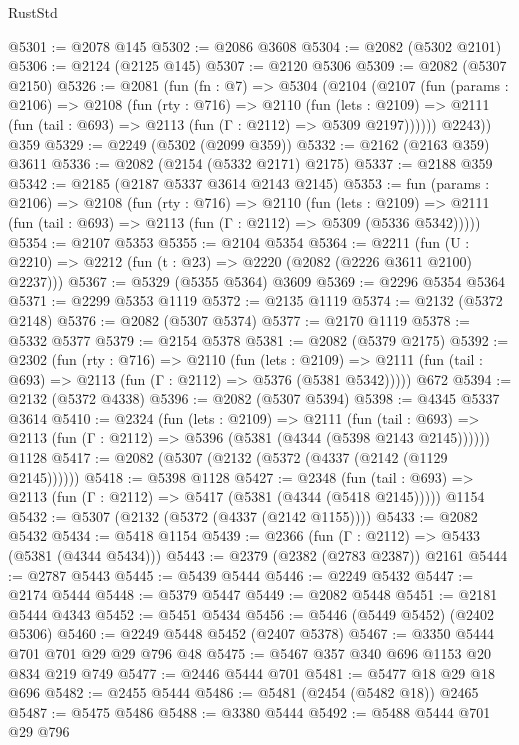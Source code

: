 \begin{lexlean}{RustStd}
\begin{coremodule}
@5301 := @2078 @145
@5302 := @2086 @3608
@5304 := @2082 (@5302 @2101)
@5306 := @2124 (@2125 @145)
@5307 := @2120 @5306
@5309 := @2082 (@5307 @2150)
@5326 := @2081
    (fun (fn : @7) =>
    @5304
      (@2104
        (@2107
          (fun (params : @2106) =>
          @2108
            (fun (rty : @716) =>
            @2110
              (fun (lets : @2109) =>
              @2111 (fun (tail : @693) => @2113 (fun (Γ : @2112) => @5309 @2197))))))
        @2243))
    @359
@5329 := @2249 (@5302 (@2099 @359))
@5332 := @2162 (@2163 @359) @3611
@5336 := @2082 (@2154 (@5332 @2171) @2175)
@5337 := @2188 @359
@5342 := @2185 (@2187 @5337 @3614 @2143 @2145)
@5353 := fun (params : @2106) =>
  @2108
    (fun (rty : @716) =>
    @2110
      (fun (lets : @2109) =>
      @2111 (fun (tail : @693) => @2113 (fun (Γ : @2112) => @5309 (@5336 @5342)))))
@5354 := @2107 @5353
@5355 := @2104 @5354
@5364 := @2211 (fun (U : @2210) => @2212 (fun (t : @23) => @2220 (@2082 (@2226 @3611 @2100) @2237)))
@5367 := @5329 (@5355 @5364) @3609
@5369 := @2296 @5354 @5364
@5371 := @2299 @5353 @1119
@5372 := @2135 @1119
@5374 := @2132 (@5372 @2148)
@5376 := @2082 (@5307 @5374)
@5377 := @2170 @1119
@5378 := @5332 @5377
@5379 := @2154 @5378
@5381 := @2082 (@5379 @2175)
@5392 := @2302
    (fun (rty : @716) =>
    @2110
      (fun (lets : @2109) =>
      @2111 (fun (tail : @693) => @2113 (fun (Γ : @2112) => @5376 (@5381 @5342)))))
    @672
@5394 := @2132 (@5372 @4338)
@5396 := @2082 (@5307 @5394)
@5398 := @4345 @5337 @3614
@5410 := @2324
    (fun (lets : @2109) =>
    @2111
      (fun (tail : @693) => @2113 (fun (Γ : @2112) => @5396 (@5381 (@4344 (@5398 @2143 @2145))))))
    @1128
@5417 := @2082 (@5307 (@2132 (@5372 (@4337 (@2142 (@1129 @2145))))))
@5418 := @5398 @1128
@5427 := @2348
    (fun (tail : @693) => @2113 (fun (Γ : @2112) => @5417 (@5381 (@4344 (@5418 @2145)))))
    @1154
@5432 := @5307 (@2132 (@5372 (@4337 (@2142 @1155))))
@5433 := @2082 @5432
@5434 := @5418 @1154
@5439 := @2366 (fun (Γ : @2112) => @5433 (@5381 (@4344 @5434)))
@5443 := @2379 (@2382 (@2783 @2387)) @2161
@5444 := @2787 @5443
@5445 := @5439 @5444
@5446 := @2249 @5432
@5447 := @2174 @5444
@5448 := @5379 @5447
@5449 := @2082 @5448
@5451 := @2181 @5444 @4343
@5452 := @5451 @5434
@5456 := @5446 (@5449 @5452) (@2402 @5306)
@5460 := @2249 @5448 @5452 (@2407 @5378)
@5467 := @3350 @5444 @701 @701 @29 @29 @796 @48
@5475 := @5467 @357 @340 @696 @1153 @20 @834 @219 @749
@5477 := @2446 @5444 @701
@5481 := @5477 @18 @29 @18 @696
@5482 := @2455 @5444
@5486 := @5481 (@2454 (@5482 @18)) @2465
@5487 := @5475 @5486
@5488 := @3380 @5444
@5492 := @5488 @5444 @701 @29 @796

\end{coremodule}
\end{lexlean}

